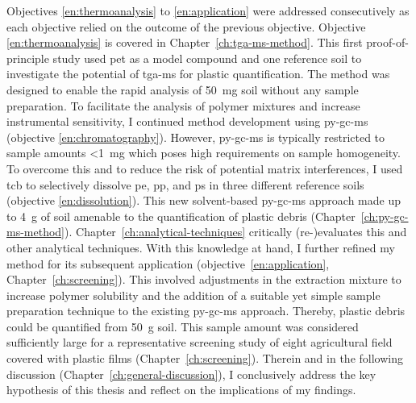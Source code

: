 Objectives \ref{en:thermoanalysis} to \ref{en:application} were addressed consecutively as each objective relied on the outcome of the previous objective. Objective \ref{en:thermoanalysis} is covered in Chapter~\ref{ch:tga-ms-method}. This first proof-of-principle study used \ac{pet} as a model compound and one reference soil to investigate the potential of \ac{tga-ms} for plastic quantification. The method was designed to enable the rapid analysis of \SI{50}{\milli\gram} soil without any sample preparation. To facilitate the analysis of polymer mixtures and increase instrumental sensitivity, I continued method development using \ac{py-gc-ms} (objective \ref{en:chromatography}). However, \ac{py-gc-ms} is typically restricted to sample amounts \SI{<1}{\milli\gram} which poses high requirements on sample homogeneity. To overcome this and to reduce the risk of potential matrix interferences, I used \acf{tcb} to selectively dissolve \ac{pe}, \ac{pp}, and \ac{ps} in three different reference soils (objective \ref{en:dissolution}). This new solvent-based \ac{py-gc-ms} approach made up to \SI{4}{g} of soil amenable to the quantification of plastic debris (Chapter~\ref{ch:py-gc-ms-method}). Chapter~\ref{ch:analytical-techniques} critically (re-)evaluates this and other analytical techniques. With this knowledge at hand, I further refined my method for its subsequent application (objective~\ref{en:application}, Chapter~\ref{ch:screening}). This involved adjustments in the extraction mixture to increase polymer solubility and the addition of a suitable yet simple sample preparation technique to the existing \ac{py-gc-ms} approach. Thereby, plastic debris could be quantified from \SI{50}{\gram} soil. This sample amount was considered sufficiently large for a representative screening study of eight agricultural field covered with plastic films (Chapter~\ref{ch:screening}). Therein and in the following discussion (Chapter~\ref{ch:general-discussion}), I conclusively address the key hypothesis of this thesis and reflect on the implications of my findings.
